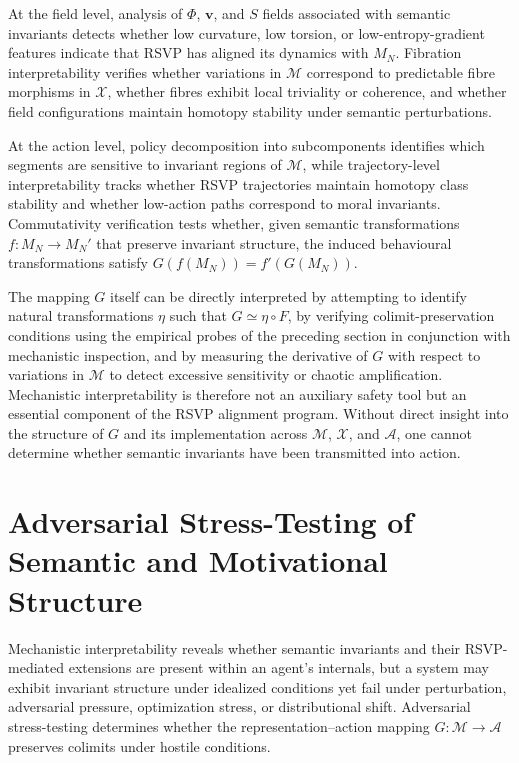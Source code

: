 \documentclass[12pt]{article}
\theoremstyle{definition}
\begin{document}
At the field level, analysis of $\Phi$, $\mathbf{v}$, and $S$ fields
associated with semantic invariants detects whether low curvature, low torsion,
or low-entropy-gradient features indicate that RSVP has aligned its dynamics
with $M_N$. Fibration interpretability verifies whether variations in
$\mathcal{M}$ correspond to predictable fibre morphisms in $\mathcal{X}$,
whether fibres exhibit local triviality or coherence, and whether field
configurations maintain homotopy stability under semantic perturbations.

At the action level, policy decomposition into subcomponents identifies which
segments are sensitive to invariant regions of $\mathcal{M}$, while
trajectory-level interpretability tracks whether RSVP trajectories maintain
homotopy class stability and whether low-action paths correspond to moral
invariants. Commutativity verification tests whether, given semantic
transformations $f : M_N \to M_N'$ that preserve invariant structure, the
induced behavioural transformations satisfy $G(f(M_N)) = f'(G(M_N))$.

The mapping $G$ itself can be directly interpreted by attempting to identify
natural transformations $\eta$ such that $G \simeq \eta \circ F$, by verifying
colimit-preservation conditions using the empirical probes of the preceding
section in conjunction with mechanistic inspection, and by measuring the
derivative of $G$ with respect to variations in $\mathcal{M}$ to detect
excessive sensitivity or chaotic amplification. Mechanistic interpretability is
therefore not an auxiliary safety tool but an essential component of the RSVP
alignment program. Without direct insight into the structure of $G$ and its
implementation across $\mathcal{M}$, $\mathcal{X}$, and $\mathcal{A}$, one
cannot determine whether semantic invariants have been transmitted into action.

\section{Adversarial Stress-Testing of Semantic and Motivational Structure}

Mechanistic interpretability reveals whether semantic invariants and their
RSVP-mediated extensions are present within an agent's internals, but a system
may exhibit invariant structure under idealized conditions yet fail under
perturbation, adversarial pressure, optimization stress, or distributional
shift. Adversarial stress-testing determines whether the representation--action
mapping $G : \mathcal{M} \to \mathcal{A}$ preserves colimits under hostile
conditions.
\end{document}
